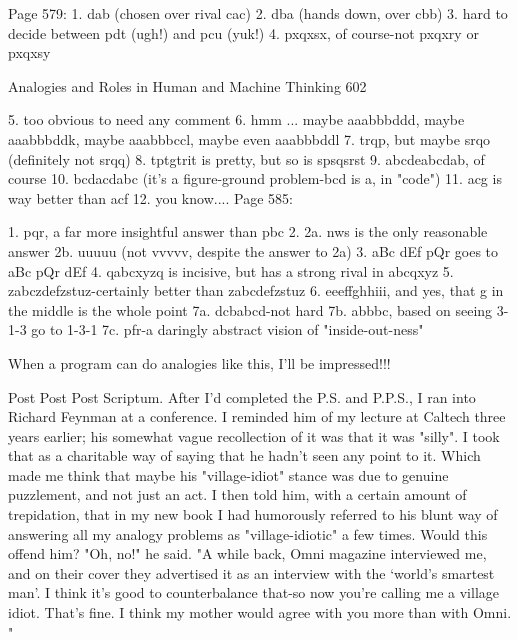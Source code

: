 Page 579:
       1. dab (chosen over rival cac)
       2. dba (hands down, over cbb)
       3. hard to decide between pdt (ugh!) and pcu (yuk!)
       4. pxqxsx, of course-not pxqxry or pxqxsy




Analogies and Roles in Human and Machine Thinking                                    602

       5. too obvious to need any comment
       6. hmm ... maybe aaabbbddd, maybe aaabbbddk, maybe aaabbbccl, maybe
          even aaabbbddl
       7. trqp, but maybe srqo (definitely not srqq)
       8. tptgtrit is pretty, but so is spsqsrst
       9. abcdeabcdab, of course
       10. bcdacdabc (it's a figure-ground problem-bcd is a, in "code")
       11. acg is way better than acf
       12. you know....
       Page 585:

       1. pqr, a far more insightful answer than pbc
       2. 2a. nws is the only reasonable answer
       2b. uuuuu (not vvvvv, despite the answer to 2a)
       3. aBc dEf pQr goes to aBc pQr dEf
       4. qabcxyzq is incisive, but has a strong rival in abcqxyz
       5. zabczdefzstuz-certainly better than zabcdefzstuz
       6. eeeffghhiii, and yes, that g in the middle is the whole point
       7a. dcbabcd-not hard
       7b. abbbc, based on seeing 3-1-3 go to 1-3-1
       7c. pfr-a daringly abstract vision of "inside-out-ness"

When a program can do analogies like this, I'll be impressed!!!

Post Post Post Scriptum.
        After I'd completed the P.S. and P.P.S., I ran into Richard Feynman at a
conference. I reminded him of my lecture at Caltech three years earlier; his somewhat
vague recollection of it was that it was "silly". I took that as a charitable way of
saying that he hadn't seen any point to it. Which made me think that maybe his
"village-idiot" stance was due to genuine puzzlement, and not just an act.
        I then told him, with a certain amount of trepidation, that in my new book I
had humorously referred to his blunt way of answering all my analogy problems as
"village-idiotic" a few times. Would this offend him? "Oh, no!" he said. "A while
back, Omni magazine interviewed me, and on their cover they advertised it as an
interview with the `world's smartest man'. I think it's good to counterbalance that-so
now you're calling me a village idiot. That's fine. I think my mother would agree with
you more than with Omni. "




